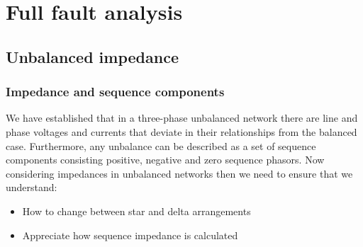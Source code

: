 \documentclass[class=report, crop=false, 12pt,a4paper]{standalone}
\begin{document}
\chapter{Full fault analysis}
\section{Unbalanced impedance}
\subsection{Impedance and sequence components}
We have established that in a three-phase unbalanced network there are line and phase voltages and currents that deviate in their relationships from the balanced case. Furthermore, any unbalance can be described as a set of sequence components consisting positive, negative and zero sequence phasors. Now considering impedances in unbalanced networks then we need to ensure that we understand:
\begin{itemize}
	\item How to change between star and delta arrangements
	\item Appreciate how sequence impedance is calculated
\end{itemize}
\end{document}

